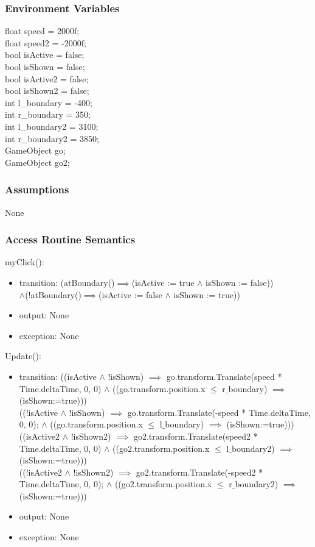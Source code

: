 \documentclass[12pt, titlepage]{article}
\begin{document}
\subsubsection{Environment Variables}
float speed = 2000f;\\
float speed2 = -2000f;\\
bool isActive = false;\\
bool isShown = false;\\
bool isActive2 = false;\\
bool isShown2 = false;\\
int l\_boundary = -400;\\
int r\_boundary = 350;\\
int l\_boundary2 = 3100;\\
int r\_boundary2 = 3850;\\
GameObject go;\\
GameObject go2;
\subsubsection{Assumptions}
None
\subsubsection{Access Routine Semantics}

\noindent myClick():
\begin{itemize}
\item transition: (atBoundary()$\implies$(isActive := true $\land $ isShown := false))\\$\land$(!atBoundary()$\implies$(isActive := false $\land $ isShown := true))
\item output: None
\item exception: None
\end{itemize}

\noindent Update():
\begin{itemize}
\item transition: 
((isActive $\land$ !isShown) $\implies$ go.transform.Translate(speed * Time.deltaTime, 0, 0) $\land$
((go.transform.position.x $\leqslant$ r$\_$boundary) $\implies$ (isShown:=true)))\\

((!isActive $\land$ !isShown) $\implies$  go.transform.Translate(-speed * Time.deltaTime, 0, 0); $\land$
((go.transform.position.x $\leqslant$ l$\_$boundary) $\implies$ (isShown:=true)))\\

((isActive2 $\land$ !isShown2) $\implies$ go2.transform.Translate(speed2 * Time.deltaTime, 0, 0) $\land$
((go2.transform.position.x $\leqslant$ l$\_$boundary2) $\implies$ (isShown:=true)))\\

((!isActive2 $\land$ !isShown2) $\implies$  go2.transform.Translate(-speed2 * Time.deltaTime, 0, 0); $\land$
((go2.transform.position.x $\leqslant$ r$\_$boundary2) $\implies$ (isShown:=true)))

\item output: None
\item exception: None
\end{itemize}
\end{document}
